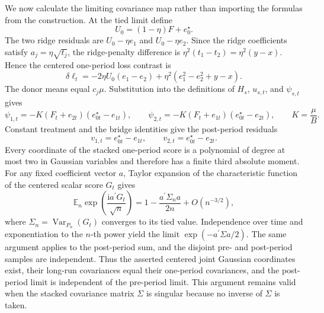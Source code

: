 We now calculate the limiting covariance map rather than importing the formulas from the construction.  At the tied limit define
\[
 U_0=(1-\eta)F+e_0^{\star}.
\]
The two ridge residuals are \(U_0-\eta e_1\) and \(U_0-\eta e_2\).  Since the ridge coefficients satisfy \(a_j=\eta\sqrt{t_j}\), the ridge-penalty difference is \(\eta^2(t_1-t_2)=\eta^2(y-x)\).  Hence the centered one-period loss contrast is
\[
 \delta\ell_t
 =-2\eta U_0(e_1-e_2)
  +\eta^2(e_1^2-e_2^2+y-x).
\]
The donor means equal \(c_j\mu\).  Substitution into the definitions of \(H_s\), \(u_{s,t}\), and \(\psi_{s,t}\) gives
\[
 \psi_{1,t}=-K(F_t+e_{2t})(e_{0t}^{\star}-e_{1t}),
 \qquad
 \psi_{2,t}=-K(F_t+e_{1t})(e_{0t}^{\star}-e_{2t}),
 \qquad
 K=\frac\mu B.
\]
Constant treatment and the bridge identities give the post-period residuals
\[
 v_{1,t}=e_{0t}^{\star}-e_{1t},
 \qquad
 v_{2,t}=e_{0t}^{\star}-e_{2t}.
\]
Every coordinate of the stacked one-period score is a polynomial of degree at most two in Gaussian variables and therefore has a finite third absolute moment.  For any fixed coefficient vector \(a\), Taylor expansion of the characteristic function of the centered scalar score \(G_t\) gives
\[
 \mathbb E_n\exp\!\left(\frac{\mathrm i a^{\prime}G_t}{\sqrt n}\right)
 =1-\frac{a^{\prime}\Sigma_na}{2n}+O(n^{-3/2}),
\]
where \(\Sigma_n=\operatorname{Var}_{P_n}(G_t)\) converges to its tied value.  Independence over time and exponentiation to the \(n\)-th power yield the limit \(\exp(-a^{\prime}\Sigma a/2)\).  The same argument applies to the post-period sum, and the disjoint pre- and post-period samples are independent.  Thus the asserted centered joint Gaussian coordinates exist, their long-run covariances equal their one-period covariances, and the post-period limit is independent of the pre-period limit.  This argument remains valid when the stacked covariance matrix \(\Sigma\) is singular because no inverse of \(\Sigma\) is taken.

